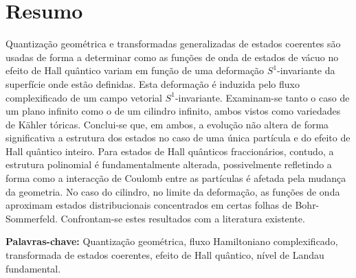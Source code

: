 \documentclass[notas.tex]{subfiles}
\begin{document}
\section*{Resumo}
Quantização geométrica e transformadas generalizadas de estados coerentes são usadas de forma a determinar como as funções de onda de estados de vácuo no efeito de Hall quântico variam em função de uma deformação $S^1$-invariante da superfície onde estão definidas. Esta deformação é induzida pelo fluxo complexificado de um campo vetorial $S^1$-invariante. Examinam-se tanto o caso de um plano infinito como o de um cilindro infinito, ambos vistos como variedades de Kähler tóricas. Conclui-se que, em ambos, a evolução não altera de forma significativa a estrutura dos estados no caso de uma única partícula e do efeito de Hall quântico inteiro. Para estados de Hall quânticos fraccionários, contudo, a estrutura polinomial é fundamentalmente alterada, possivelmente refletindo a forma como a interacção de Coulomb entre as partículas é afetada pela mudança da geometria. No caso do cilindro, no limite da deformação, as funções de onda aproximam estados distribucionais concentrados em certas folhas de Bohr-Sommerfeld. Confrontam-se estes resultados com a literatura existente.

\bigskip
{\bfseries Palavras-chave:} Quantização geométrica, fluxo Hamiltoniano complexificado, transformada de estados coerentes, efeito de Hall quântico, nível de Landau fundamental.
\end{document}
